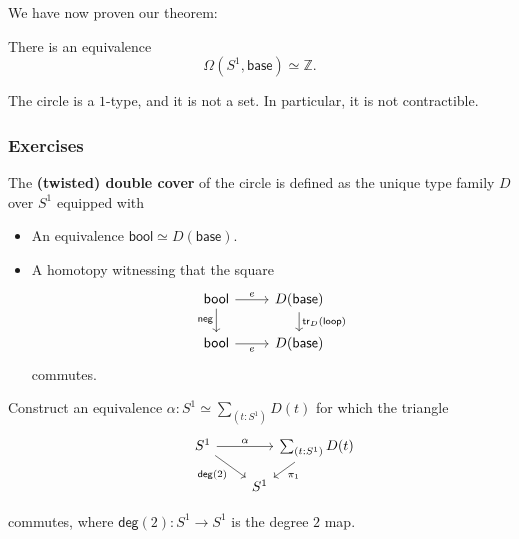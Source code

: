 \documentclass[handout]{beamer}
\newcommand{\Z}{\mathbb{Z}}
\newcommand{\sphere}[1]{S^{#1}}
\newcommand{\baseS}{\mathsf{base}}
\newcommand{\loopS}{\mathsf{loop}}
\newcommand{\tr}{\mathsf{tr}}
\newcommand{\bool}{\mathsf{bool}}
\begin{document}
\begin{frame}
  We have now proven our theorem:
  \begin{theorem}
    There is an equivalence
    \begin{equation*}
      \Omega(\sphere{1},\baseS)\simeq \Z.
    \end{equation*}
  \end{theorem}

  \begin{corollary}
    The circle is a $1$-type, and it is not a set. In particular, it is not contractible.
  \end{corollary}
\end{frame}

\begin{frame}
  \frametitle{Exercises}
  The \textbf{(twisted) double cover} of the circle is defined as the unique type family $D$ over $\sphere{1}$ equipped with
  \begin{itemize}
  \item An equivalence $\bool\simeq D(\baseS)$.
  \item A homotopy witnessing that the square
    \begin{equation*}
      \begin{tikzcd}[ampersand replacement=\&,row sep=1.4em]
        \bool \arrow[r,"e"] \arrow[d,swap,"\mathsf{neg}"] \& D(\baseS) \arrow[d,"\tr_{D}(\loopS)"] \\
        \bool \arrow[r,swap,"e"] \& D(\baseS)
      \end{tikzcd}
    \end{equation*}
    commutes.
  \end{itemize}
  Construct an equivalence $\alpha:{\sphere{1}}\simeq{\sum_{(t:\sphere{1})}D(t)}$ for which the triangle
  \begin{equation*}
    \begin{tikzcd}[column sep=0em,ampersand replacement=\&,row sep=small]
      \sphere{1} \arrow[rr,"\alpha"] \arrow[dr,swap,"\mathsf{deg}(2)"] \& \& \sum_{(t:\sphere{1})}D(t) \arrow[dl,"\pi_1"] \\
      \phantom{\sum_{(t:\sphere{1})}D(t)} \& \sphere{1}
    \end{tikzcd}
  \end{equation*}
  commutes, where $\mathsf{deg}(2):\sphere{1}\to\sphere{1}$ is the degree $2$ map.
\end{frame}
\end{document}
